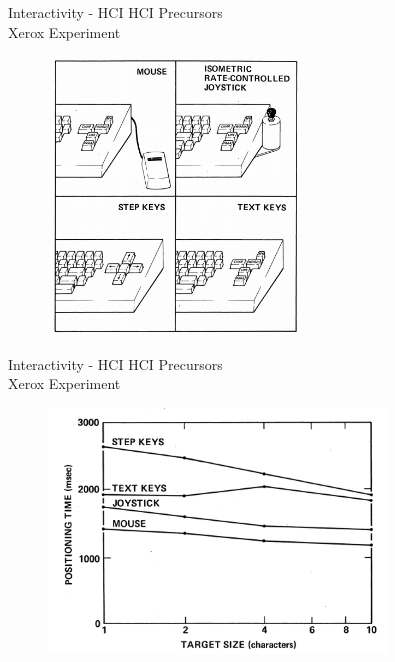 \documentclass{beamer}
\begin{document}
\begin{frame}{Interactivity - HCI} 
    HCI Precursors\\
    Xerox Experiment
    \begin{figure}[h]
        \includegraphics[width=0.6\textwidth]{xerox2.png}
    \end{figure}
\end{frame}

\begin{frame}{Interactivity - HCI} 
    HCI Precursors\\
    Xerox Experiment
    \begin{figure}[h]
        \includegraphics[width=0.8\textwidth]{xerox.png}
    \end{figure}
\end{frame}
\end{document}
